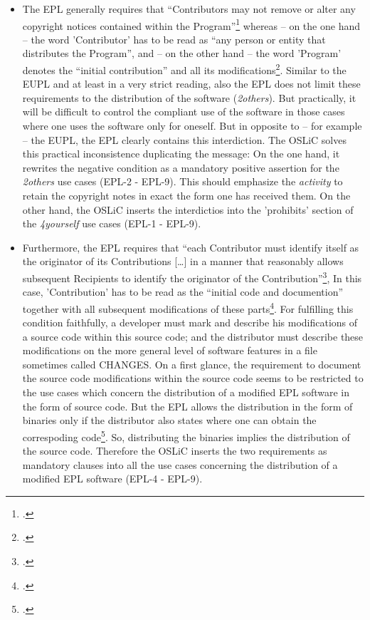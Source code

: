 \begin{itemize}

  \item The EPL generally requires that \enquote{Contributors may not remove or
  alter any copyright notices contained within the
  Program}\footcite[cf.][\nopage wp.\ §3]{Epl10OsiLicense2005a} whereas -- on the
  one hand -- the word 'Contributor' has to be read as \enquote{any person or
  entity that distributes the Program}, and -- on the other hand -- the word
  'Program' denotes the \enquote{initial contribution} and all its
  modifications\footcite[cf.][\nopage wp.\ §1]{Epl10OsiLicense2005a}. Similar to
  the EUPL and at least in a very strict reading, also the EPL does not limit
  these requirements to the distribution of the software (\emph{2others}). But
  practically, it will be difficult to control the compliant use of the software
  in those cases where one uses the software only for oneself. But in opposite
  to -- for example -- the EUPL, the EPL clearly contains this interdiction. The
  OSLiC solves this practical inconsistence duplicating the message: On the one
  hand, it rewrites the negative condition as a mandatory positive assertion for
  the \emph{2others} use cases (EPL-2 - EPL-9). This should emphasize the
  \emph{activity} to retain the copyright notes in exact the form one has
  received them. On the other hand, the OSLiC inserts the interdictios into the
  'prohibits' section of the \emph{4yourself} use cases (EPL-1 - EPL-9).
  
  \item Furthermore, the EPL requires that \enquote{each Contributor must
  identify itself as the originator of its Contributions [\ldots] in a manner
  that reasonably allows subsequent Recipients to identify the originator of the
  Contribution}\footcite[cf.][\nopage wp.\ §3]{Epl10OsiLicense2005a}, In this
  case, 'Contribution' has to be read as the \enquote{initial code and
  documention} together with all subsequent modifications of these
  parts\footcite[cf.][\nopage wp.\ §1]{Epl10OsiLicense2005a}. For fulfilling this
  condition faithfully, a developer must mark and describe his modifications of
  a source code within this source code; and the distributor must describe these
  modifications on the more general level of software features in a file
  sometimes called CHANGES. On a first glance, the requirement to document the
  source code modifications within the source code seems to be restricted to the
  use cases which concern the distribution of a modified EPL software in the
  form of source code. But the EPL allows the distribution in the form of
  binaries only if the distributor also states where one can obtain the
  correspoding code\footcite[cf.][\nopage wp.\ §3]{Epl10OsiLicense2005a}. So,
  distributing the binaries implies the distribution of the source code.
  Therefore the OSLiC inserts the two requirements as mandatory clauses into all
  the use cases concerning the distribution of a modified EPL software (EPL-4 -
  EPL-9).
  

\end{itemize}
